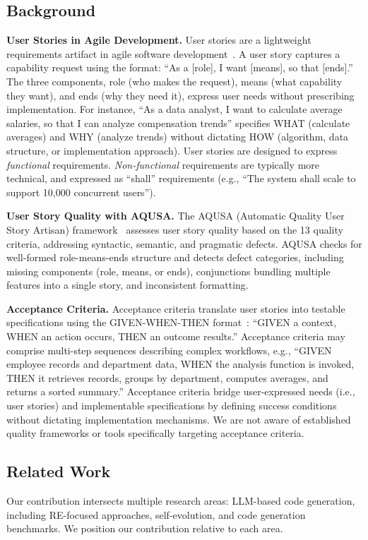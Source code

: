 \documentclass[sigconf,screen]{acmart}
\begin{document}
\subsection{Background}

\textbf{User Stories in Agile Development.} User stories are a lightweight requirements artifact in agile software development~\cite{cohn2004userstori}. A user story captures a capability request using the format: ``As a [role], I want [means], so that [ends].'' The three components, role (who makes the request), means (what capability they want), and ends (why they need it), express user needs without prescribing implementation. For instance, ``As a data analyst, I want to calculate average salaries, so that I can analyze compensation trends'' specifies WHAT (calculate averages) and WHY (analyze trends) without dictating HOW (algorithm, data structure, or implementation approach).
User stories are designed to express \textit{functional} requirements. \textit{Non-functional} requirements are typically more technical, and expressed as ``shall'' requirements (e.g., ``The system shall scale to support 10{,}000 concurrent users'').

\textbf{User Story Quality with AQUSA.} The AQUSA (Automatic Quality User Story Artisan) framework~\cite{lucassen2016aqusa} assesses user story quality based on the 13 quality criteria, addressing syntactic, semantic, and pragmatic defects. AQUSA checks for well-formed role-means-ends structure and detects defect categories, including missing components (role, means, or ends), conjunctions bundling multiple features into a single story, and inconsistent formatting.

\textbf{Acceptance Criteria.} Acceptance criteria translate user stories into testable specifications using the GIVEN-WHEN-THEN format~\cite{north2006bdd}: ``GIVEN a context, WHEN an action occurs, THEN an outcome results.'' Acceptance criteria may comprise multi-step sequences describing complex workflows, e.g., ``GIVEN employee records and department data, WHEN the analysis function is invoked, THEN it retrieves records, groups by department, computes averages, and returns a sorted summary.'' Acceptance criteria bridge user-expressed needs (i.e., user stories) and implementable specifications by defining success conditions without dictating implementation mechanisms.
We are not aware of established quality frameworks or tools specifically targeting acceptance criteria.

\subsection{Related Work}
Our contribution intersects multiple research areas: LLM-based code generation, including RE-focused approaches, self-evolution, and code generation benchmarks. We position our contribution relative to each area.
\end{document}
